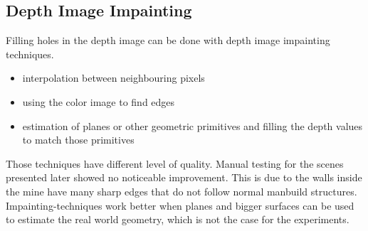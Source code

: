 \subsection{Depth Image Impainting}

Filling holes in the depth image can be done with depth image impainting techniques.

\begin{itemize}
    \item interpolation between neighbouring pixels
    \item using the color image to find edges
    \item estimation of planes or other geometric primitives and filling the depth values to match those primitives
\end{itemize}

Those techniques have different level of quality.
Manual testing for the scenes presented later showed no noticeable improvement.
This is due to the walls inside the mine have many sharp edges that do not follow normal manbuild structures.
Impainting-techniques work better when planes and bigger surfaces can be used to estimate the real world geometry, which is not the case for the experiments.

